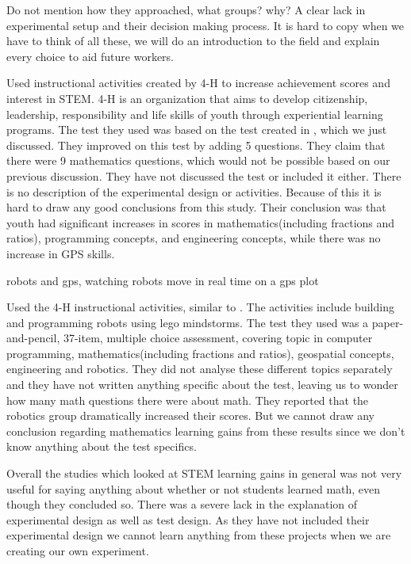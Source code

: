 \bigskip\noindent
\cite{barker2007robotics} Do not mention how they approached, what groups? why?
\cite{nugent2008effect} A clear lack in experimental setup and their decision making process. It is hard to copy when we have to think of all these, we will do an introduction to the field and explain every choice to aid future workers. 

\bigskip\noindent
\cite{nugent2008effect} Used instructional activities created by 4-H to increase achievement scores and interest in STEM. 4-H is an organization that aims to develop citizenship, leadership, responsibility and life skills of youth through experiential learning programs. The test they used was based on the test created in \cite{barker2007robotics}, which we just discussed. They improved on this test by adding 5 questions. They claim that there were 9 mathematics questions, which would not be possible based on our previous discussion. They have not discussed the test or included it either. There is no description of the experimental design or activities. Because of this it is hard to draw any good conclusions from this study. Their conclusion was that youth had significant increases in scores in mathematics(including fractions and ratios), programming concepts, and engineering concepts, while there was no increase in GPS skills.

\bigskip\noindent
\cite{nugent2008effect} robots and gps, watching robots move in real time on a gps plot

\bigskip\noindent
\cite{nugent2009use} Used the 4-H instructional activities, similar to \cite{nugent2008effect}. The activities include building and programming robots using lego mindstorms. The test they used was a paper-and-pencil, 37-item, multiple choice assessment, covering topic in computer programming, mathematics(including fractions and ratios), geospatial concepts, engineering and robotics. They did not analyse these different topics separately and they have not written anything specific about the test, leaving us to wonder how many math questions there were about math. They reported that the robotics group dramatically increased their scores. But we cannot draw any conclusion regarding mathematics learning gains from these results since we don’t know anything about the test specifics.

\bigskip\noindent
Overall the studies which looked at STEM learning gains in general was not very useful for saying anything about whether or not students learned math, even though they concluded so. There was a severe lack in the explanation of experimental design as well as test design. As they have not included their experimental design we cannot learn anything from these projects when we are creating our own experiment. 

